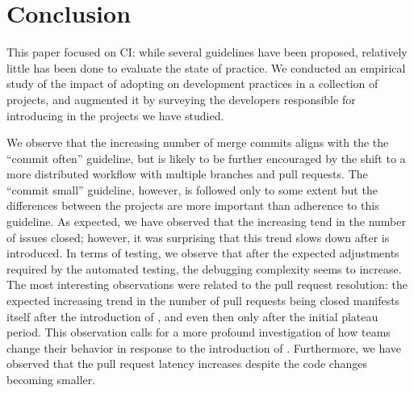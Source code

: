 
\section{Conclusion}
\label{sec:conc}

This paper focused on CI: while several guidelines have been proposed, relatively little has been done to evaluate the 
state of practice.
We conducted an 
empirical study of the impact of adopting \Tvis on development practices in a collection of \GH projects,
and augmented it by surveying the developers responsible for introducing \Tvis in the projects we have studied.

We observe that the increasing number of merge commits aligns with the the ``commit often'' guideline, but is likely to be further encouraged by the shift to a more distributed workflow with multiple branches and pull requests.
The ``commit small'' guideline, however, is followed only to some extent but the differences between the projects are more important than adherence to this guideline.
As expected, we have observed that the increasing tend in the number of issues closed; however, it was surprising that this trend slows down after \Tvis is introduced.
In terms of testing, we observe that after the expected adjustments required by the automated testing, the debugging complexity seems to increase. 
The most interesting observations were related to the pull request resolution: the expected increasing trend in the number of pull requests being closed manifests itself after the introduction of \Tvis, and even then only after the initial plateau period. 
This observation calls for a more profound investigation of how \GH teams change their behavior in response to the introduction of \Tvis. 
Furthermore, we have observed that the pull request latency increases  despite the code changes becoming smaller.
